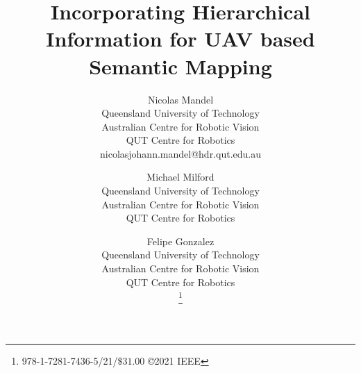 \documentclass[twocolumn,letterpaper]{IEEEAerospaceCLS}  %
\begin{document}
\title{Incorporating Hierarchical Information for UAV based Semantic Mapping}

\author{%
    Nicolas Mandel\\
    Queensland University of Technology\\
    Australian Centre for Robotic Vision\\
    QUT Centre for Robotics\\
    nicolasjohann.mandel@hdr.qut.edu.au
    \and
    Michael Milford\\
    Queensland University of Technology\\
    Australian Centre for Robotic Vision\\
    QUT Centre for Robotics\\
    \and
    Felipe Gonzalez\\
    Queensland University of Technology\\
    Australian Centre for Robotic Vision\\
    QUT Centre for Robotics\\
    \thanks{\footnotesize 978-1-7281-7436-5/21/$\$31.00$ \copyright2021 IEEE}              %
}



\maketitle

\thispagestyle{plain}
\pagestyle{plain}



\maketitle

\thispagestyle{plain}
\pagestyle{plain}
\end{document}
